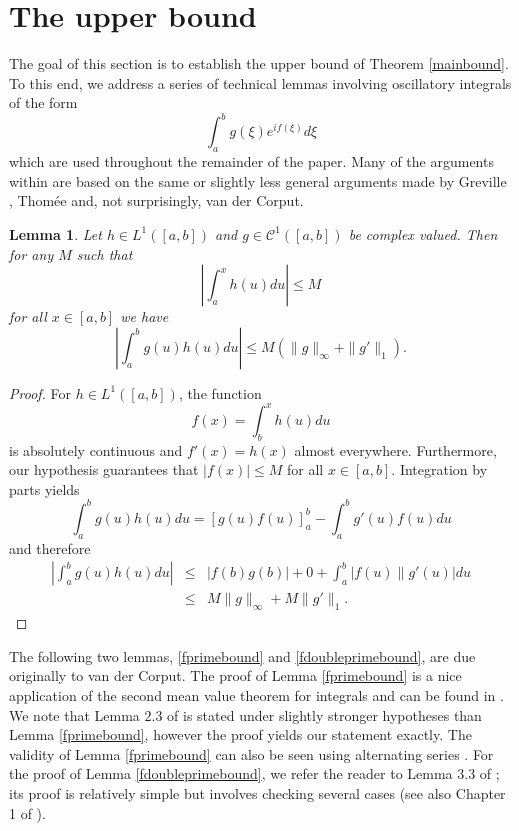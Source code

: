 \documentclass{article}
\theoremstyle{theorem}
\newtheorem{lemma}[theorem]{Lemma}
\theoremstyle{remark}
\begin{document}
\section{The upper bound}\label{upperboundsec}


\noindent The goal of this section is to establish the upper bound of Theorem \ref{mainbound}. To this end,
we address a series of technical lemmas involving oscillatory integrals of the
form 
\begin{equation*}
\int_a^b g(\xi)e^{if(\xi)}d\xi
\end{equation*}
which are used throughout the remainder of the paper. Many of the
arguments within are based on the same or slightly less general arguments made
by Greville \cite{TNEG}, Thom\'{e}e \cite{VT2} and, not surprisingly, van der
Corput. 

\begin{lemma}\label{boundbyparts}
 Let $h\in L^1([a,b])$ and $g\in\mathcal{C}^1([a,b])$ be complex valued. Then
for any $M$ such that
\begin{equation*}
\left|\int_a^x h(u)du\right|\leq M
\end{equation*}
for all $x\in[a,b]$ we have
\begin{equation*}
\left|\int_a^b g(u)h(u)du\right|\leq M\left(\|g\|_\infty+\|g'\|_1\right).
\end{equation*}
\end{lemma}
\begin{proof}
 For $h\in L^1([a,b])$, the function
\begin{equation*}
 f(x)=\int_b^xh(u)du
\end{equation*}
is absolutely continuous and $f'(x)=h(x)$ almost everywhere. Furthermore, our
hypothesis guarantees that $|f(x)|\leq M$ for all $x\in[a,b]$. Integration by
parts yields
\begin{equation*}
\int_a^b g(u)h(u)du=\left[g(u)f(u)\right]_a^b-\int_a^b g'(u)f(u)du
\end{equation*}
and therefore
\begin{eqnarray*}
 \left|\int_a^b g(u)h(u)du\right|&\leq&|f(b)g(b)|+0+\int_a^b|f(u)\|g'(u)|du\\
&\leq& M\|g\|_{\infty}+M\|g'\|_1.
\end{eqnarray*}
\end{proof}

\noindent The following two lemmas, \ref{fprimebound} and \ref{fdoubleprimebound}, are due originally to van der Corput. The proof of Lemma \ref{fprimebound} is a nice application of the second mean value theorem for integrals and can be found in \cite{VT2}. We note that Lemma $2.3$ of \cite{VT2} is stated under slightly stronger hypotheses than Lemma \ref{fprimebound}, however the proof yields our statement exactly. The validity of Lemma \ref{fprimebound} can also be seen using alternating series \cite{TNEG}. For the proof of Lemma \ref{fdoubleprimebound}, we refer the reader to Lemma 3.3 of \cite{VT2}; its proof is relatively simple but involves checking several cases (see also Chapter 1 of \cite{BTW}).
\end{document}
